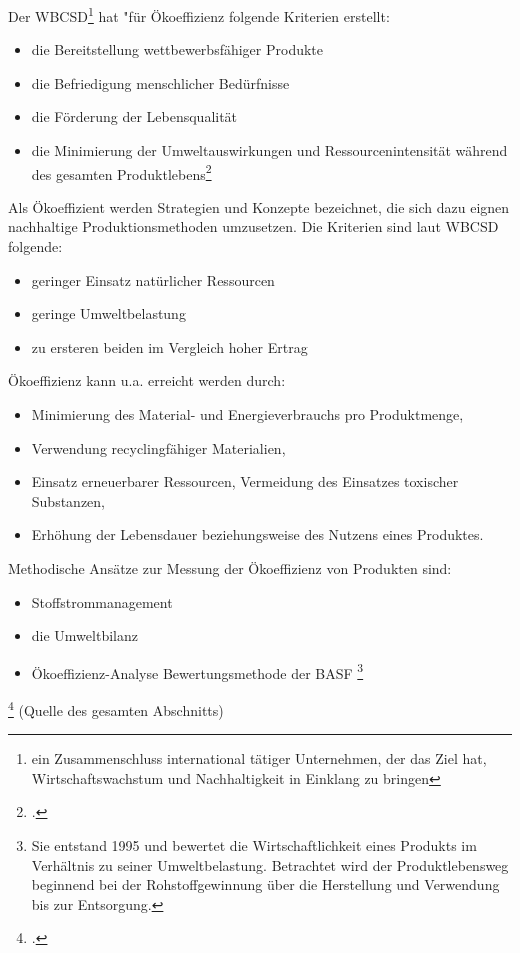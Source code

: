 \documentclass{scrartcl}
\begin{document}
   
 Der WBCSD\footnote{ein Zusammenschluss international tätiger Unternehmen, der das Ziel hat, Wirtschaftswachstum und Nachhaltigkeit in Einklang zu bringen} hat "für Ökoeffizienz folgende Kriterien erstellt: 
 
 \begin{itemize}
 \item die Bereitstellung wettbewerbsfähiger Produkte
 \item die Befriedigung menschlicher Bedürfnisse 
 \item die Förderung der Lebensqualität
 \item die Minimierung der Umweltauswirkungen und Ressourcenintensität während des gesamten Produktlebens\footcite{OkoeffizienzBrockhaus.de}
 \end{itemize}

Als Ökoeffizient werden Strategien und Konzepte bezeichnet, die sich dazu eignen nachhaltige Produktionsmethoden umzusetzen. Die Kriterien sind laut WBCSD folgende:
\begin{itemize}
\item geringer Einsatz natürlicher Ressourcen
\item geringe Umweltbelastung
\item zu ersteren beiden im Vergleich hoher Ertrag
\end{itemize}


Ökoeffizienz kann u.a. erreicht werden durch:
\begin{itemize}
\item Minimierung des Material- und Energieverbrauchs pro Produktmenge,
\item Verwendung recyclingfähiger Materialien,
\item Einsatz erneuerbarer Ressourcen, Vermeidung des Einsatzes toxischer Substanzen,
\item Erhöhung der Lebensdauer beziehungsweise des Nutzens eines Produktes.
\end{itemize}

Methodische Ansätze zur Messung der Ökoeffizienz von Produkten sind:
\begin{itemize}
\item Stoffstrommanagement
\item die Umweltbilanz
\item Ökoeffizienz-Analyse Bewertungsmethode der BASF \footnote{Sie entstand 1995 und bewertet die Wirtschaftlichkeit eines Produkts im Verhältnis zu seiner Umweltbelastung. Betrachtet wird der Produktlebensweg beginnend bei der Rohstoffgewinnung über die Herstellung und Verwendung bis zur Entsorgung.}
\end{itemize}
\footcite{DefinitionWirtschaftslexikonc} (Quelle des gesamten Abschnitts)
\end{document}
